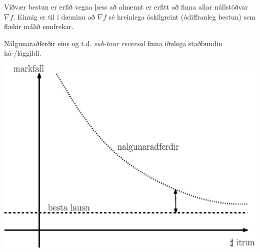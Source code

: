 Víðvær bestun er erfið vegna þess að almennt er erfitt að finna allar núllstöðvar $\nabla f$. Einnig er til í dæminu að $\nabla f$ sé hreinlega óskilgreint (ódiffranleg bestun) sem flækir málið ennfrekar.

Nálgunaraðferðir eins og t.d. \emph{sub-tour reversal} finna iðulega staðbundin há-/lággildi.

\begin{center}
  \includegraphics[width=0.5\columnwidth]{figs/global_approx.eps}
\end{center}

